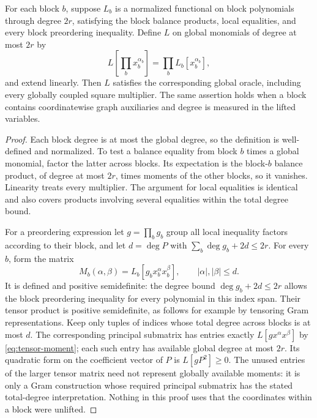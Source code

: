 \begin{lemma}
\label{lem:tensor-preordering}
For each block $b$, suppose $L_b$ is a normalized functional on block
polynomials through degree $2r$, satisfying the block balance products,
local equalities, and every block preordering inequality. Define $L$ on
global monomials of degree at most $2r$ by
\begin{equation}\label{eq:tensor-moment}
 L\left[\prod_b x_b^{\alpha_b}\right]=
             \prod_b L_b[x_b^{\alpha_b}],
\end{equation}
and extend linearly. Then $L$ satisfies the corresponding global oracle,
including every globally coupled square multiplier.
The same assertion holds when a block contains coordinatewise graph
auxiliaries and degree is measured in the lifted variables.
\end{lemma}
\begin{proof}
Each block degree is at most the global degree, so the definition is
well-defined and normalized. To test a balance equality from block $b$
times a global monomial, factor the latter across blocks. Its expectation
is the block-$b$ balance product, of degree at most $2r$, times moments
of the other blocks, so it vanishes. Linearity treats every multiplier.
The argument for local equalities is identical and also covers products
involving several equalities within the total degree bound.

For a preordering expression let $g=\prod_b g_b$ group all local
inequality factors according to their block, and let $d=\deg P$ with
$\sum_b\deg g_b+2d\le2r$. For every $b$, form the matrix
\[
 M_b(\alpha,\beta)=L_b[g_b x_b^\alpha x_b^\beta],
 \qquad |\alpha|,|\beta|\le d.
\]
It is defined and positive semidefinite: the degree bound
$\deg g_b+2d\le2r$ allows the block preordering inequality for every
polynomial in this index span. Their tensor product is positive
semidefinite, as follows for example by tensoring Gram representations.
Keep only tuples of indices whose total degree across blocks is at most
$d$. The corresponding principal submatrix has entries exactly
$L[gx^\alpha x^\beta]$ by \eqref{eq:tensor-moment}; each such entry has
available global degree at most $2r$. Its quadratic form on the
coefficient vector of $P$ is $L[gP^2]\ge0$.
The unused entries of the larger tensor matrix need not represent
globally available moments: it is only a Gram construction whose required
principal submatrix has the stated total-degree interpretation. Nothing
in this proof uses that the coordinates within a block were unlifted.
\end{proof}

